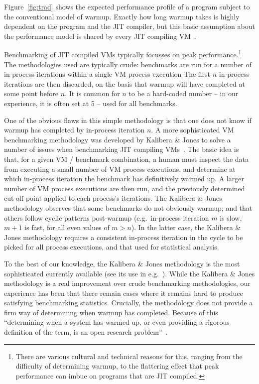 \documentclass[a4paper,UKenglish]{lipics}
\newcommand{\kalibera}{Kalibera \& Jones\xspace}
\begin{document}
Figure~\ref{fig:trad} shows the expected performance profile of a
program subject to the conventional model of warmup. Exactly how long warmup
takes is highly dependent on
the program and the JIT compiler, but this basic assumption about the
performance model is shared by every JIT compiling
VM~\cite{kalibera13rigorous}.

Benchmarking of JIT compiled VMs typically focusses on peak
performance.\footnote{There are various cultural and technical reasons for this,
ranging from the difficulty of determining warmup, to the flattering effect that
peak performance can imbue on programs that are JIT compiled.} The
methodologies used are typically crude: benchmarks are run for a number
of in-process iterations within a single VM process execution
The first $n$ in-process iterations are then discarded, on the basis that warmup
will have completed at some point before $n$. It is common for
$n$ to be a hard-coded number -- in our experience, it is often set at 5 -- used
for all benchmarks.

One of the obvious flaws in this simple methodology is that one does not know if warmup
has completed by in-process iteration $n$. A more sophisticated VM benchmarking methodology
was developed by \kalibera to solve a number of issues when benchmarking JIT
compiling VMs~\cite{kalibera12quantifying,kalibera13rigorous}. The basic idea is
that, for a given VM / benchmark combination, a human must inspect the data from
executing a small number of VM process executions, and determine at which in-process iteration the
benchmark has definitively warmed up. A larger number of VM process executions are then
run, and the previously determined cut-off point applied to each process's
iterations. The \kalibera methodology observes that some benchmarks do not
obviously warmup; and that others follow cyclic patterns post-warmup
(e.g.~in-process iteration $m$ is slow, $m+1$ is fast, for all even values of $m > n$). In
the latter case, the \kalibera methodology requires a consistent in-process iteration in
the cycle to be picked for all process executions, and that used for statistical analysis.

To the best of our knowledge, the \kalibera methodology is the most
sophisticated currently available (see its use in
e.g.~\cite{barrett15approaches,grimmer15dynamically}). While the \kalibera
methodology is a real improvement over crude benchmarking methodologies,
our experience has been that there remain cases where it remains hard to produce
satisfying benchmarking statistics. Crucially, the methodology does not
provide a firm way of determining when warmup has completed. Because of this
``determining when a system has warmed up, or even providing a
rigorous definition of the term, is an open research problem''~\cite{seaton15phd}.
\end{document}

